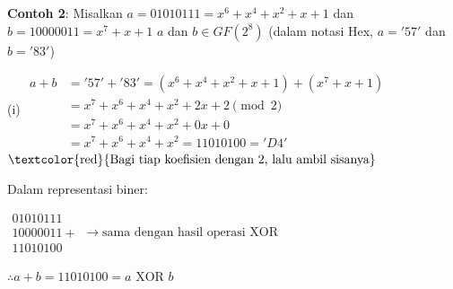 \documentclass{article}
\begin{document}

\textbf{Contoh 2}: Misalkan $a = 01010111 = x^6 + x^4 + x^2 + x + 1$ dan $b = 10000011 = x^7 + x + 1$
$a$ dan $b \in GF(2^8)$ \quad (dalam notasi Hex, $a = '57'$ dan $b = '83'$)

(i) $\begin{align*} a + b &= '57' + '83' = (x^6 + x^4 + x^2 + x + 1) + (x^7 + x + 1) \\ &= x^7 + x^6 + x^4 + x^2 + 2x + 2 \pmod{2} \\ &= x^7 + x^6 + x^4 + x^2 + 0x + 0 \\ &= x^7 + x^6 + x^4 + x^2 = 11010100 = 'D4' \end{align*}$ \vspace{5mm} $\text{\textcolor{red}{Bagi tiap koefisien dengan 2, lalu ambil sisanya}}$

Dalam representasi biner:

$\begin{array}{rl} 01010111 \\ 10000011 + \\ \hline 11010100 \end{array} \rightarrow \text{sama dengan hasil operasi XOR}$

$\therefore a + b = 11010100 = a \text{ XOR } b$
\end{document}
